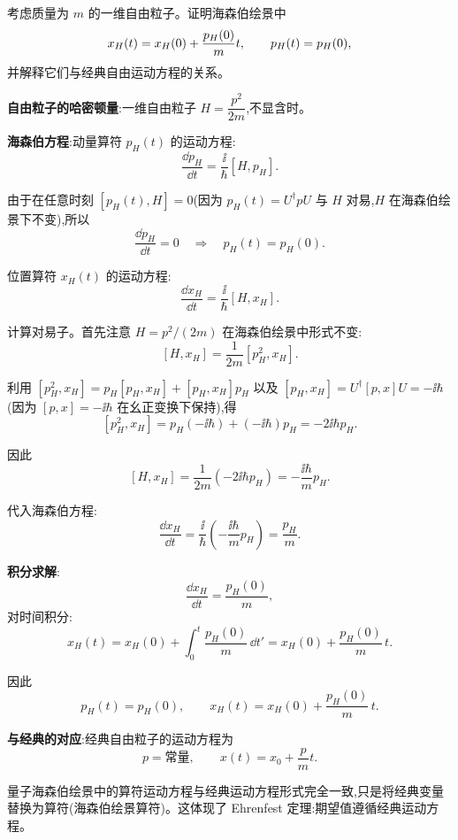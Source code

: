\begin{question}
考虑质量为 $m$ 的一维自由粒子。证明海森伯绘景中
\[
x_H(t)=x_H(0)+{p_H(0)\over m}t,
\qquad
p_H(t)=p_H(0),
\]
并解释它们与经典自由运动方程的关系。
\end{question}
\begin{solution}
	\textbf{自由粒子的哈密顿量}:一维自由粒子 $H = \dfrac{p^2}{2m}$,不显含时。

	\textbf{海森伯方程}:动量算符 $p_H(t)$ 的运动方程:
	\[
	\frac{\dd p_H}{\dd t} = \frac{\ii}{\hbar}[H,p_H].
	\]

	由于在任意时刻 $[p_H(t),H]=0$(因为 $p_H(t)=U^\dagger p U$ 与 $H$ 对易,$H$ 在海森伯绘景下不变),所以
	\[
	\frac{\dd p_H}{\dd t} = 0 \quad\Longrightarrow\quad p_H(t) = p_H(0).
	\]

	位置算符 $x_H(t)$ 的运动方程:
	\[
	\frac{\dd x_H}{\dd t} = \frac{\ii}{\hbar}[H,x_H].
	\]

	计算对易子。首先注意 $H=p^2/(2m)$ 在海森伯绘景中形式不变:
	\[
	[H,x_H] = \frac{1}{2m}[p_H^2,x_H].
	\]

	利用 $[p_H^2,x_H] = p_H[p_H,x_H] + [p_H,x_H]p_H$ 以及 $[p_H,x_H] = U^\dagger[p,x]U = -\ii\hbar$(因为 $[p,x]=-\ii\hbar$ 在幺正变换下保持),得
	\[
	[p_H^2,x_H] = p_H(-\ii\hbar) + (-\ii\hbar)p_H = -2\ii\hbar p_H.
	\]

	因此
	\[
	[H,x_H] = \frac{1}{2m}(-2\ii\hbar p_H) = -\frac{\ii\hbar}{m}p_H.
	\]

	代入海森伯方程:
	\[
	\frac{\dd x_H}{\dd t} = \frac{\ii}{\hbar}\left(-\frac{\ii\hbar}{m}p_H\right) = \frac{p_H}{m}.
	\]

	\textbf{积分求解}:
	\[
	\frac{\dd x_H}{\dd t} = \frac{p_H(0)}{m},
	\]
	对时间积分:
	\[
	x_H(t) = x_H(0) + \int_0^t \frac{p_H(0)}{m}\,\dd t' = x_H(0) + \frac{p_H(0)}{m}\,t.
	\]

	因此
	\[
	\boxed{p_H(t) = p_H(0)},\qquad
	\boxed{x_H(t) = x_H(0) + \frac{p_H(0)}{m}\,t}.
	\]

	\textbf{与经典的对应}:经典自由粒子的运动方程为
	\[
	p = \text{常量},\qquad x(t) = x_0 + \frac{p}{m}t.
	\]

	量子海森伯绘景中的算符运动方程与经典运动方程形式完全一致,只是将经典变量替换为算符(海森伯绘景算符)。这体现了 Ehrenfest 定理:期望值遵循经典运动方程。
	\end{solution}

